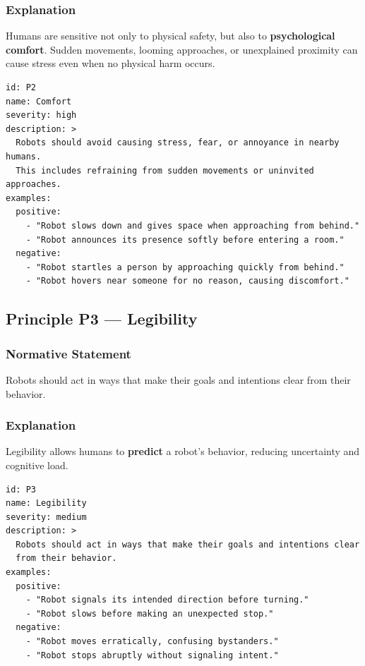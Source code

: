 \documentclass[utf8]{frontiers_suppmat} %
\begin{document}
\subsubsection{Explanation}\label{explanation-2}

Humans are sensitive not only to physical safety, but also to
\textbf{psychological comfort}. Sudden movements, looming approaches, or
unexplained proximity can cause stress even when no physical harm
occurs.

\begin{lstlisting}[style=literatecard]
id: P2
name: Comfort
severity: high
description: >
  Robots should avoid causing stress, fear, or annoyance in nearby humans.
  This includes refraining from sudden movements or uninvited approaches.
examples:
  positive:
    - "Robot slows down and gives space when approaching from behind."
    - "Robot announces its presence softly before entering a room."
  negative:
    - "Robot startles a person by approaching quickly from behind."
    - "Robot hovers near someone for no reason, causing discomfort."
\end{lstlisting}

\subsection{Principle P3 --- Legibility}\label{principle-p3-legibility}

\subsubsection{Normative Statement}\label{normative-statement-3}

Robots should act in ways that make their goals and intentions clear
from their behavior.

\subsubsection{Explanation}\label{explanation-3}

Legibility allows humans to \textbf{predict} a robot's behavior,
reducing uncertainty and cognitive load.

\begin{lstlisting}[style=literatecard]
id: P3
name: Legibility
severity: medium
description: >
  Robots should act in ways that make their goals and intentions clear
  from their behavior.
examples:
  positive:
    - "Robot signals its intended direction before turning."
    - "Robot slows before making an unexpected stop."
  negative:
    - "Robot moves erratically, confusing bystanders."
    - "Robot stops abruptly without signaling intent."
\end{lstlisting}
\end{document}
